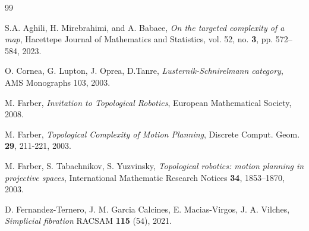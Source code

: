 \documentclass[preprint,11pt %
]{hjm1}
\theoremstyle{definition}
\begin{document}
\begin{thebibliography}{99}



S.A. Aghili, H. Mirebrahimi, and A. Babaee, {\it On the targeted complexity of a map}, Hacettepe Journal of Mathematics and Statistics, vol. 52, no. {\bf 3}, pp. 572--584, 2023.






O. Cornea, G. Lupton, J. Oprea, D.Tanre, \textit{Lusternik-Schnirelmann category},  AMS Monographs 103, 2003.


M. Farber, \textit{Invitation to Topological Robotics}, European Mathematical Society, 2008.

M. Farber, \textit{Topological Complexity of Motion Planning}, Discrete Comput. Geom. {\bf 29}, 211-221, 2003.


M. Farber, S. Tabachnikov, S. Yuzvinsky, {\it Topological robotics: motion planning in projective spaces}, {International Mathematic Research Notices} {\bf 34}, 1853--1870, 2003.


D. Fernandez-Ternero, J. M. Garcia Calcines, E. Macias-Virgos, J. A. Vilches, \textit{Simplicial fibration} RACSAM {\bf 115} (54), 2021.


\end{thebibliography}
\end{document}
